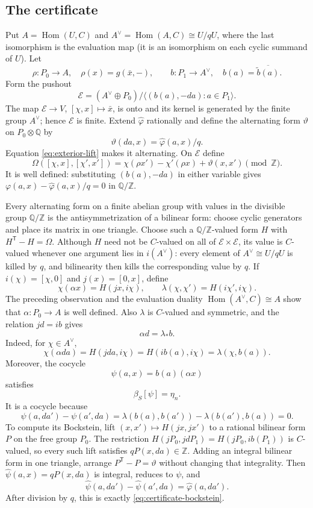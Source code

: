\documentclass[11pt]{amsart}
\theoremstyle{remark}
\newcommand{\Z}{\mathbb Z}
\newcommand{\Q}{\mathbb Q}
\newcommand{\Hom}{\operatorname{Hom}}
\begin{document}
\subsection*{The certificate}

Put $A=\Hom(U,C)$ and $A^\vee=\Hom(A,C)\cong U/qU$, where the last
isomorphism is the evaluation map (it is an isomorphism on each cyclic
summand of $U$).  Let
\[
 \rho:P_0\to A,
 \quad \rho(x)=g(\bar x,-),
 \qquad
 b:P_1\to A^\vee,
 \quad b(a)=\overline{\widetilde b(a)}.
\]
Form the pushout
\[
 \mathcal E=(A^\vee\oplus P_0)/
 \langle(b(a),-da):a\in P_1\rangle.
\]
The map $\mathcal E\to V$, $[\chi,x]\mapsto\bar x$, is onto and its
kernel is generated by the finite group $A^\vee$; hence $\mathcal E$ is
finite.
Extend $\widehat\varphi$ rationally and define the alternating form
$\vartheta$ on $P_0\otimes\Q$ by
\[
 \vartheta(da,x)=\widehat\varphi(a,x)/q.
\]
Equation \eqref{eq:exterior-lift} makes it alternating.  On
$\mathcal E$ define
\[
 \Omega([\chi,x],[\chi',x'])
 =\chi(\rho x')-\chi'(\rho x)+\vartheta(x,x')\pmod\Z.
\]
It is well defined: substituting $(b(a),-da)$ in either variable
gives
$\varphi(a,x)-\widehat\varphi(a,x)/q=0$ in $\Q/\Z$.

Every alternating form on a finite abelian group with values in the
divisible group $\Q/\Z$ is the antisymmetrization of a bilinear form:
choose cyclic generators and place its matrix in one triangle.  Choose
such a $\Q/\Z$-valued form $H$ with
$H^{\mathsf T}-H=\Omega$.  Although $H$ need not be $C$-valued on all
of $\mathcal E\times\mathcal E$, its value is $C$-valued whenever one
argument lies in $i(A^\vee)$: every element of $A^\vee\cong U/qU$ is
killed by $q$, and bilinearity then kills the corresponding value by
$q$.
If
$i(\chi)=[\chi,0]$ and $j(x)=[0,x]$, define
\[
 \chi(\alpha x)=H(jx,i\chi),
 \qquad
 \lambda(\chi,\chi')=H(i\chi',i\chi).
\]
The preceding observation and the evaluation duality
$\Hom(A^\vee,C)\cong A$ show that $\alpha:P_0\to A$ is well defined.
Also $\lambda$ is $C$-valued and symmetric, and the relation
$jd=ib$ gives
\begin{equation}\label{eq:certificate-relation}
                         \alpha d=\lambda_*b.
\end{equation}
Indeed, for $\chi\in A^\vee$,
\[
 \chi(\alpha da)=H(jda,i\chi)=H(ib(a),i\chi)
 =\lambda(\chi,b(a)).
\]
Moreover, the cocycle
\[
                         \psi(a,x)=b(a)(\alpha x)
\]
satisfies
\begin{equation}\label{eq:certificate-bockstein}
                         \beta_S[\psi]=\eta_n.
\end{equation}
It is a cocycle because
\[
 \psi(a,da')-\psi(a',da)
 =\lambda(b(a),b(a'))-\lambda(b(a'),b(a))=0.
\]
To compute its Bockstein, lift
$(x,x')\mapsto H(jx,jx')$ to a rational bilinear form
$P$ on the free group $P_0$.  The restriction
$H(jP_0,jdP_1)=H(jP_0,ib(P_1))$ is $C$-valued, so every such lift
satisfies $qP(x,da)\in\Z$.  Adding an integral bilinear form in one
triangle, arrange $P^{\mathsf T}-P=\vartheta$ without changing that
integrality.  Then $\widehat\psi(a,x)=qP(x,da)$ is integral, reduces to
$\psi$, and
\[
 \widehat\psi(a,da')-\widehat\psi(a',da)
 =\widehat\varphi(a,da').
\]
After division by $q$, this is exactly
\eqref{eq:certificate-bockstein}.
\end{document}
